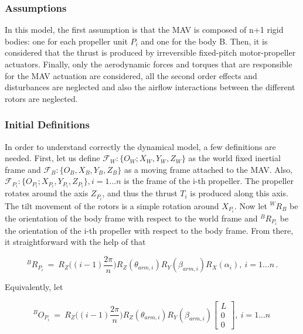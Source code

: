 \subsubsection{Assumptions}
\label{sec:assumptions}
In this model, the first assumption is that the MAV is composed of n+1 rigid bodies:
one for each propeller unit $P_i$ and one for the body B. Then, it is considered that
the thrust is produced by irreversible fixed-pitch motor-propeller actuators. Finally,
only the aerodynamic forces and torques that are responsible for the MAV actuation
are considered, all the second order effects and disturbances are neglected and
also the airflow interactions between the different rotors are neglected.

\subsubsection{Initial Definitions}
\label{sec:definitions}
In order to understand correctly the dynamical model, a few definitions are
needed. First, let us define $\mathcal{F}_{W} : \{O_{W}; X_{W},  Y_{W},  Z_{W}\}$
as the world fixed inertial frame and $\mathcal{F}_{B}: \{O_{B}, X_{B},  Y_{B},
Z_{B}\}$
as a moving frame attached to the MAV. Also, $\mathcal{F}_{P_{i}} : \{O_{P_{i}};
X_{P_{i}}, Y_{P_{i}},  Z_{P_{i}}\}, i = 1...n$ is the frame of the i-th propeller.
The propeller rotates around the axis $Z_{P_{i}}$, and thus the thrust $T_{i}$ is
produced along this axis. The tilt movement of the rotors is a simple rotation
around $X_{P_{i}}$. Now let $^{W}R_{B}$ be the orientation of the body frame
with respect to the world frame and $^{B}R_{P_{i}}$ be the orientation of the
i-th propeller with respect to the body frame. From there, it
straightforward with the help of  that

\begin{equation}
  \label{rot_b_pi}
  ^{B}R_{P_{i}} \ = \ R_{Z}\bigg((i-1)\frac{2\pi}{n}\bigg) R_Z(\theta_{arm,i})
  R_Y(\beta_{arm,i}) R_{X}(\alpha_{i}),\  i = 1...n\, .
\end{equation}

Equivalently, let

\begin{equation}
  \label{O_pi}
  ^{B}O_{P_{i}} \ = \ R_{Z}\bigg((i-1)\frac{2\pi}{n}\bigg) R_Z(\theta_{arm,i}) R_Y(\beta_{arm,i})
  \begin{bmatrix}
    L \\
    0 \\
    0
  \end{bmatrix}
  ,\   i = 1...n \,
\end{equation}

